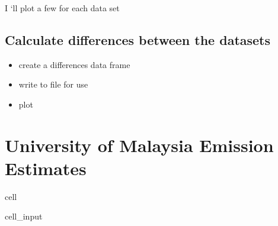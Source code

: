 \documentclass[letterpaper,10pt,english]{jupyterBook}
\begin{document}
\sphinxAtStartPar
I ‘ll plot a few for each data set


\subsection{Calculate differences between the datasets}
\label{\detokenize{notebooks/data_exploration:calculate-differences-between-the-datasets}}\begin{itemize}
\item {} 
\sphinxAtStartPar
create a differences data frame

\item {} 
\sphinxAtStartPar
write to file for use

\item {} 
\sphinxAtStartPar
plot

\end{itemize}


\section{University of Malaysia Emission Estimates}
\label{\detokenize{notebooks/data_exploration:university-of-malaysia-emission-estimates}}
\begin{sphinxuseclass}{cell}\begin{sphinxVerbatimInput}

\begin{sphinxuseclass}{cell_input}
\begin{sphinxVerbatim}[commandchars=\\\{\}]
  

  
\end{sphinxVerbatim}

\end{sphinxuseclass}\end{sphinxVerbatimInput}

\end{sphinxuseclass}
\end{document}
